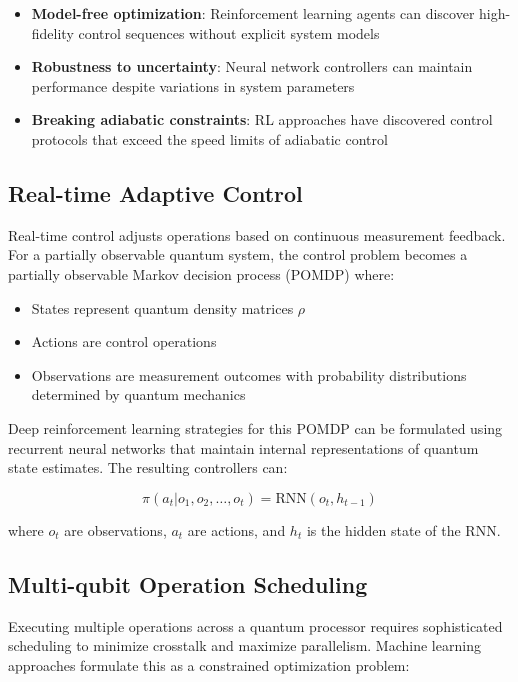 \begin{itemize}
    \item \textbf{Model-free optimization}: Reinforcement learning agents can discover high-fidelity control sequences without explicit system models \cite{bukov2018reinforcement}
    
    \item \textbf{Robustness to uncertainty}: Neural network controllers can maintain performance despite variations in system parameters
    
    \item \textbf{Breaking adiabatic constraints}: RL approaches have discovered control protocols that exceed the speed limits of adiabatic control \cite{ding2021breaking}
\end{itemize}

\subsection{Real-time Adaptive Control}
Real-time control adjusts operations based on continuous measurement feedback. For a partially observable quantum system, the control problem becomes a partially observable Markov decision process (POMDP) where:

\begin{itemize}
    \item States represent quantum density matrices $\rho$
    \item Actions are control operations
    \item Observations are measurement outcomes with probability distributions determined by quantum mechanics
\end{itemize}

Deep reinforcement learning strategies for this POMDP can be formulated using recurrent neural networks that maintain internal representations of quantum state estimates. The resulting controllers can:

\begin{equation}
\pi(a_t | o_1, o_2, \ldots, o_t) = \text{RNN}(o_t, h_{t-1})
\end{equation}

where $o_t$ are observations, $a_t$ are actions, and $h_t$ is the hidden state of the RNN.

\subsection{Multi-qubit Operation Scheduling}
Executing multiple operations across a quantum processor requires sophisticated scheduling to minimize crosstalk and maximize parallelism. Machine learning approaches formulate this as a constrained optimization problem:

